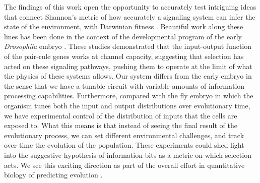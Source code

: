The findings of this work open the opportunity to accurately test intriguing
ideas that connect Shannon's metric of how accurately a signaling system can
infer the state of the environment, with Darwinian fitness \cite{Taylor2007}.
Beautiful work along these lines has been done in the context of the
developmental program of the early {\it Drosophila} embryo \cite{Tkacik2008,
Petkova2016}. These studies demonstrated that the input-output function of the
pair-rule genes works at channel capacity, suggesting that selection has
acted on these signaling pathways, pushing them to operate at the limit of what
the physics of these systems allows. Our system differs from the early embryo in
the sense that we have a tunable circuit with variable amounts of information
processing capabilities. Furthermore, compared with the fly embryo in which the
organism tunes both the input and output distributions over evolutionary time,
we have experimental control of the distribution of inputs that the cells are
exposed to. What this means is that instead of seeing the final result of the
evolutionary process, we can set different environmental challenges, and track
over time the evolution of the population. These experiments could shed light
into the suggestive hypothesis of information bits as a metric on which
selection acts. We see this exciting direction as part of the overall effort in
quantitative biology of predicting evolution \cite{Lassig2017}.

